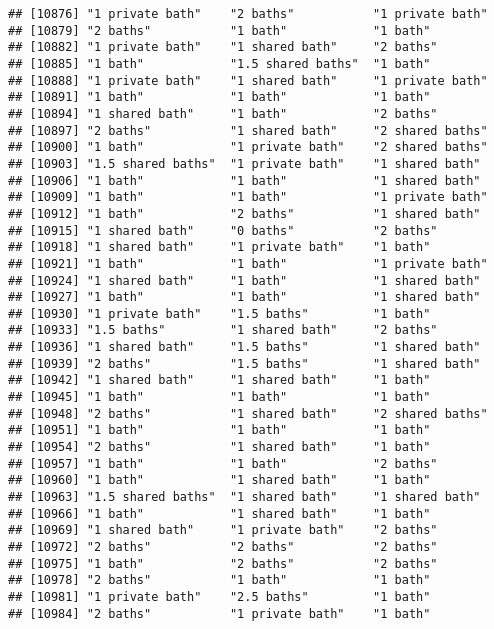 \documentclass[
]{article}
\begin{document}
\begin{verbatim}
## [10876] "1 private bath"    "2 baths"           "1 private bath"   
## [10879] "2 baths"           "1 bath"            "1 bath"           
## [10882] "1 private bath"    "1 shared bath"     "2 baths"          
## [10885] "1 bath"            "1.5 shared baths"  "1 bath"           
## [10888] "1 private bath"    "1 shared bath"     "1 private bath"   
## [10891] "1 bath"            "1 bath"            "1 bath"           
## [10894] "1 shared bath"     "1 bath"            "2 baths"          
## [10897] "2 baths"           "1 shared bath"     "2 shared baths"   
## [10900] "1 bath"            "1 private bath"    "2 shared baths"   
## [10903] "1.5 shared baths"  "1 private bath"    "1 shared bath"    
## [10906] "1 bath"            "1 bath"            "1 shared bath"    
## [10909] "1 bath"            "1 bath"            "1 private bath"   
## [10912] "1 bath"            "2 baths"           "1 shared bath"    
## [10915] "1 shared bath"     "0 baths"           "2 baths"          
## [10918] "1 shared bath"     "1 private bath"    "1 bath"           
## [10921] "1 bath"            "1 bath"            "1 private bath"   
## [10924] "1 shared bath"     "1 bath"            "1 shared bath"    
## [10927] "1 bath"            "1 bath"            "1 shared bath"    
## [10930] "1 private bath"    "1.5 baths"         "1 bath"           
## [10933] "1.5 baths"         "1 shared bath"     "2 baths"          
## [10936] "1 shared bath"     "1.5 baths"         "1 shared bath"    
## [10939] "2 baths"           "1.5 baths"         "1 shared bath"    
## [10942] "1 shared bath"     "1 shared bath"     "1 bath"           
## [10945] "1 bath"            "1 bath"            "1 bath"           
## [10948] "2 baths"           "1 shared bath"     "2 shared baths"   
## [10951] "1 bath"            "1 bath"            "1 bath"           
## [10954] "2 baths"           "1 shared bath"     "1 bath"           
## [10957] "1 bath"            "1 bath"            "2 baths"          
## [10960] "1 bath"            "1 shared bath"     "1 bath"           
## [10963] "1.5 shared baths"  "1 shared bath"     "1 shared bath"    
## [10966] "1 bath"            "1 shared bath"     "1 bath"           
## [10969] "1 shared bath"     "1 private bath"    "2 baths"          
## [10972] "2 baths"           "2 baths"           "2 baths"          
## [10975] "1 bath"            "2 baths"           "2 baths"          
## [10978] "2 baths"           "1 bath"            "1 bath"           
## [10981] "1 private bath"    "2.5 baths"         "1 bath"           
## [10984] "2 baths"           "1 private bath"    "1 bath"           

\end{verbatim}
\end{document}
